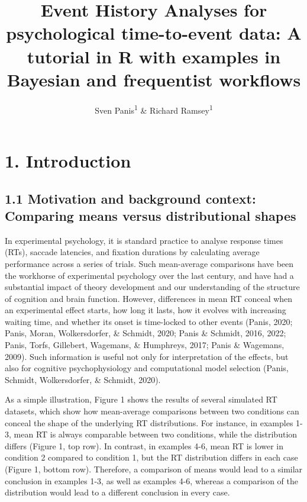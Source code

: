 \documentclass[
  man,floatsintext]{apa6}
\title{Event History Analyses for psychological time-to-event data: A tutorial in R with examples in Bayesian and frequentist workflows}
\author{Sven Panis\textsuperscript{1} \& Richard Ramsey\textsuperscript{1}}
\date{}
\affiliation{\vspace{0.5cm}\textsuperscript{1} ETH Zürich}
\begin{document}
\maketitle

\section{1. Introduction}\label{introduction}

\subsection{1.1 Motivation and background context: Comparing means versus distributional shapes}\label{motivation-and-background-context-comparing-means-versus-distributional-shapes}

In experimental psychology, it is standard practice to analyse response times (RTs), saccade latencies, and fixation durations by calculating average performance across a series of trials. Such mean-average comparisons have been the workhorse of experimental psychology over the last century, and have had a substantial impact of theory development and our understanding of the structure of cognition and brain function. However, differences in mean RT conceal when an experimental effect starts, how long it lasts, how it evolves with increasing waiting time, and whether its onset is time-locked to other events (Panis, 2020; Panis, Moran, Wolkersdorfer, \& Schmidt, 2020; Panis \& Schmidt, 2016, 2022; Panis, Torfs, Gillebert, Wagemans, \& Humphreys, 2017; Panis \& Wagemans, 2009). Such information is useful not only for interpretation of the effects, but also for cognitive psychophysiology and computational model selection (Panis, Schmidt, Wolkersdorfer, \& Schmidt, 2020).

As a simple illustration, Figure 1 shows the results of several simulated RT datasets, which show how mean-average comparisons between two conditions can conceal the shape of the underlying RT distributions. For instance, in examples 1-3, mean RT is always comparable between two conditions, while the distribution differs (Figure 1, top row). In contrast, in examples 4-6, mean RT is lower in condition 2 compared to condition 1, but the RT distribution differs in each case (Figure 1, bottom row). Therefore, a comparison of means would lead to a similar conclusion in examples 1-3, as well as examples 4-6, whereas a comparison of the distribution would lead to a different conclusion in every case.
\end{document}
